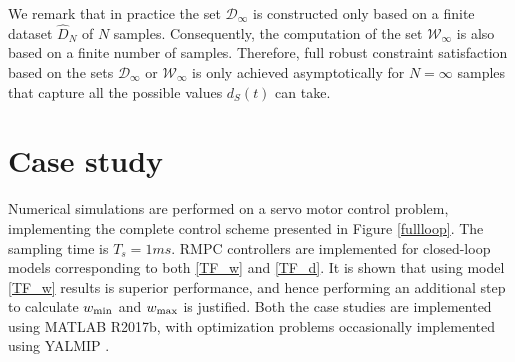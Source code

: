 \documentclass[letterpaper, 10 pt, conference]{ieeeconf}  %
\begin{document}

We remark that in practice the set $\mathcal{D}_{\infty}$ is constructed only based on a finite dataset $\hat{D}_{N}$ of $N$ samples. Consequently, the computation of the set $\mathcal{W}_{\infty}$ is also based  on a finite number of samples. Therefore, full robust
constraint satisfaction based on the sets $\mathcal{D}_{\infty}$ or $\mathcal{W}_{\infty}$
is only achieved asymptotically for $N=\infty$ samples
that capture all the possible values $d_S(t)$ can take.

\section{Case study}
	Numerical simulations are performed on a servo motor control problem, implementing the complete control scheme presented in Figure \ref{fullloop}. The sampling time is $T_s = 1 ms$. RMPC controllers are implemented for closed-loop models corresponding to both \eqref{TF_w} and \eqref{TF_d}. It is shown that using model \eqref{TF_w} results is superior performance, and hence performing an additional step to calculate $w_{\rm min}$ and $w_{\rm max}$ is justified.
	Both the case studies are implemented using MATLAB R2017b, with optimization problems occasionally implemented using YALMIP \cite{Lofberg2004}.
	\label{Case studies}
	\iffalse
\end{document}

